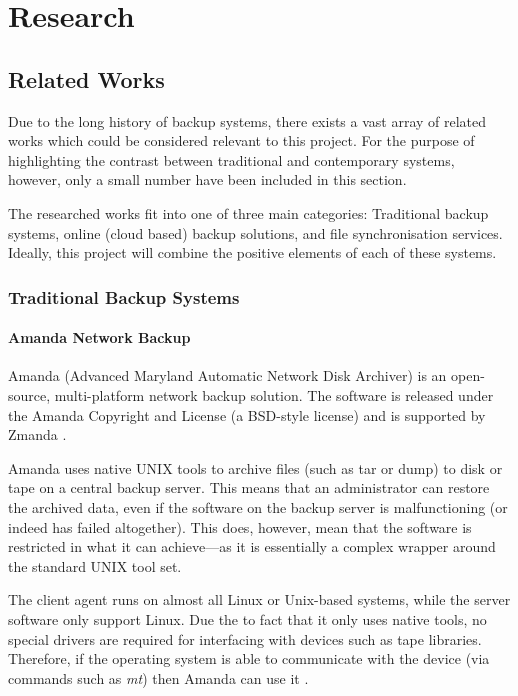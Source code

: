 \chapter{Research}

\section{Related Works}

Due to the long history of backup systems, there exists a vast array of related
works which could be considered relevant to this project. For the purpose of
highlighting the contrast between traditional and contemporary systems,
however, only a small number have been included in this section.

The researched works fit into one of three main categories: Traditional backup
systems, online (cloud based) backup solutions, and file synchronisation
services. Ideally, this project will combine the positive elements of each of
these systems.

\subsection{Traditional Backup Systems}

\subsubsection{Amanda Network Backup}

Amanda (Advanced Maryland Automatic Network Disk Archiver) is an open-source,
multi-platform network backup solution\cite{AMANDA-about}. The software is
released under the Amanda Copyright and License (a BSD-style license) and is
supported by Zmanda \cite{AMANDA-license}.

Amanda uses native UNIX tools to archive files (such as tar or dump) to disk or
tape on a central backup server. This means that an administrator can restore
the archived data, even if the software on the backup server is malfunctioning
(or indeed has failed altogether). This does, however, mean that the software
is restricted in what it can achieve---as it is essentially a complex wrapper
around the standard UNIX tool set.

The client agent runs on almost all Linux or Unix-based systems, while the
server software only support Linux. Due the to fact that it only uses native
tools, no special drivers are required for interfacing with devices such as
tape libraries. Therefore, if the operating system is able to communicate with
the device (via commands such as \emph{mt}) then Amanda can use
it \cite{AMANDA-about}.

